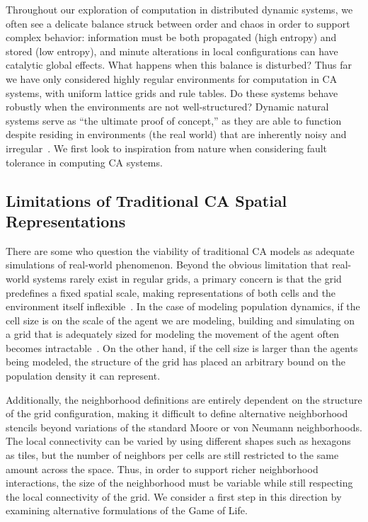 \documentclass[a4paper,11pt]{article}
\begin{document}
Throughout our exploration of computation in distributed dynamic systems, we often see a delicate balance struck between order and chaos in order to support complex behavior: information must be both propagated (high entropy) and stored (low entropy), and minute alterations in local configurations can have catalytic global effects. What happens when this balance is disturbed? Thus far we have only considered highly regular environments for computation in CA systems, with uniform lattice grids and rule tables. Do these systems behave robustly when the environments are not well-structured? Dynamic natural systems serve as ``the ultimate proof of concept,'' as they are able to function despite residing in environments (the real world) that are inherently noisy and irregular~\cite{si99}. We first look to inspiration from nature when considering fault tolerance in computing CA systems. 


\subsection{Limitations of Traditional CA Spatial Representations}

There are some who question the viability of traditional CA models as adequate simulations of real-world phenomenon. Beyond the obvious limitation that real-world systems rarely exist in regular grids, a primary concern is that the grid predefines a fixed spatial scale, making representations of both cells and the environment itself inflexible~\cite{he98}. In the case of modeling population dynamics, if the cell size is on the scale of the agent we are modeling, building and simulating on a grid that is adequately sized for modeling the movement of the agent often becomes intractable~\cite{bi07}. On the other hand, if the cell size is larger than the agents being modeled, the structure of the grid has placed an arbitrary bound on the population density it can represent.

Additionally, the neighborhood definitions are entirely dependent on the structure of the grid configuration, making it difficult to define alternative neighborhood stencils beyond variations of the standard Moore or von Neumann neighborhoods. The local connectivity can be varied by using different shapes such as hexagons as tiles, but the number of neighbors per cells are still restricted to the same amount across the space. Thus, in order to support richer neighborhood interactions, the size of the neighborhood must be variable while still respecting the local connectivity of the grid. We consider a first step in this direction by examining alternative formulations of the Game of Life.
\end{document}
